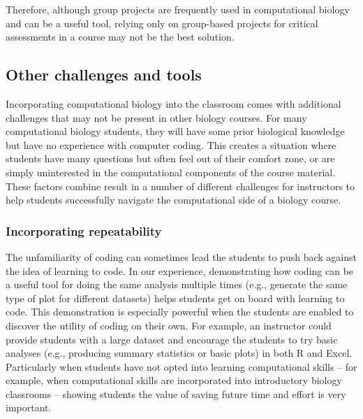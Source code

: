 Therefore, although group projects are frequently used in computational biology and can be a useful tool, relying only on group-based projects for critical assessments in a course may not be the best solution.



\subsection{Other challenges and tools}

Incorporating computational biology into the classroom comes with additional challenges that may not be present in other biology courses.
For many computational biology students, they will have some prior biological knowledge but have no experience with computer coding.
This creates a situation where students have many questions but often feel out of their comfort zone, or are simply uninterested in the computational components of the course material.
These factors combine result in a number of different challenges for instructors to help students successfully navigate the computational side of a biology course.

\subsubsection{Incorporating repeatability}
The unfamiliarity of coding can sometimes lead the students to push back against the idea of learning to code.
In our experience, demonstrating how coding can be a useful tool for doing the same analysis multiple times (e.g., generate the same type of plot for different datasets) helps students get on board with learning to code. 
This demonstration is especially powerful when the students are enabled to discover the utility of coding on their own. 
For example, an instructor could provide students with a large dataset and encourage the students to try basic analyses (e.g., producing summary statistics or basic plots) in both R and Excel. 
Particularly when students have not opted into learning computational skills -- for example, when computational skills are incorporated into introductory biology classrooms -- showing students the value of saving future time and effort is very important. 


